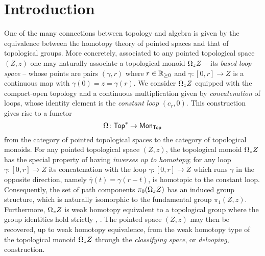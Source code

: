 
\section{Introduction}


One of the many connections between topology and algebra is given by the equivalence between the homotopy theory of pointed spaces and that of topological groups.
More concretely, associated to any pointed topological space $(Z,z)$ one may naturally associate a topological monoid $\Omega_z Z$ -- its \textit{based loop space} -- whose points are pairs $(\gamma, r)$ where $r \in \mathbb{R}_{\geq 0}$ and $\gamma \colon [0,r] \to Z$ is a continuous map with $\gamma(0) = z = \gamma(r)$.
We consider $\Omega_z Z$  equipped with the compact-open topology and a continuous multiplication given by \textit{concatenation} of loops, whose identity element is the \textit{constant loop} $(c_r,0)$.
This construction gives rise to a functor
\[
\Omega \colon \mathsf{Top}^{\ast} \to \mathsf{Mon}_{\mathsf{Top}}
\]
from the category of pointed topological spaces to the category of topological monoids.
For any pointed topological space $(Z,z)$, the topological monoid $\Omega_z Z$ has the special property of having \textit{inverses up to homotopy}; for any loop $\gamma \colon [0,r] \to Z $ its concatenation with the loop $\overline{\gamma} \colon [0,r] \to Z$ which runs $\gamma$ in the opposite direction, namely $\overline{\gamma}(t) = \gamma(r-t)$, is homotopic to the constant loop.
Consequently, the set of path components $\pi_0(\Omega_z Z)$ has an induced group structure, which is naturally isomorphic to the fundamental group $\pi_1(Z,z)$.
Furthermore, $\Omega_z Z$ is weak homotopy equivalent to a topological group where the group identities hold strictly \cite{milnor1956bundles}, \cite{berger1995loops}.
The pointed space $(Z,z)$ may then be recovered, up to weak homotopy equivalence, from the weak homotopy type of the topological monoid $\Omega_z Z$ through the \textit{classifying space}, or \textit{delooping}, construction.

